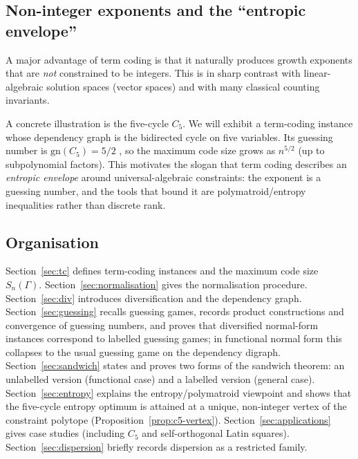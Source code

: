 \documentclass[11pt]{article}
\theoremstyle{plain}
\theoremstyle{definition}
\theoremstyle{definition}
\theoremstyle{remark}
\newcommand{\Sn}{S_n}
\newcommand{\gn}{\mathrm{gn}}
\begin{document}
\subsection{Non-integer exponents and the ``entropic envelope''}

A major advantage of term coding is that it naturally produces growth exponents that are \emph{not} constrained
to be integers.
This is in sharp contrast with linear-algebraic solution spaces (vector spaces) and with many classical
counting invariants.

A concrete illustration is the five-cycle $C_5$.
We will exhibit a term-coding instance whose dependency graph is the bidirected cycle on five variables.
Its guessing number is $\gn(C_5)=5/2$ \cite{riis2007graphentropy,christofides2011guessing},
so the maximum code size grows as $n^{5/2}$
(up to subpolynomial factors).
This motivates the slogan that term coding describes an \emph{entropic envelope} around universal-algebraic
constraints: the exponent is a guessing number, and the tools that bound it are polymatroid/entropy
inequalities rather than discrete rank.

\subsection{Organisation}

Section~\ref{sec:tc} defines term-coding instances and the maximum code size $\Sn(\Gamma)$.
Section~\ref{sec:normalisation} gives the normalisation procedure.
Section~\ref{sec:div} introduces diversification and the dependency graph.
Section~\ref{sec:guessing} recalls guessing games, records product constructions and convergence of guessing numbers, and
proves that diversified normal-form instances correspond to labelled guessing games; in functional normal form this collapses
to the usual guessing game on the dependency digraph.
Section~\ref{sec:sandwich} states and proves two forms of the sandwich theorem: an unlabelled version (functional case)
and a labelled version (general case).
Section~\ref{sec:entropy} explains the entropy/polymatroid viewpoint and shows that the
five-cycle entropy optimum is attained at a unique, non-integer vertex of the constraint
polytope (Proposition~\ref{prop:c5-vertex}).
Section~\ref{sec:applications} gives case studies (including $C_5$ and self-orthogonal Latin squares).
Section~\ref{sec:dispersion} briefly records dispersion as a restricted family.
\end{document}
